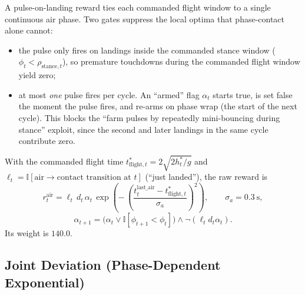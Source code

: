 \documentclass[11pt, a4paper]{article}
\begin{document}
A pulse-on-landing reward ties each commanded flight window to a single
continuous air phase. Two gates suppress the local optima that
phase-contact alone cannot:
\begin{itemize}
    \item the pulse only fires on landings inside the commanded stance window
    ($\phi_t < \rho_{\mathrm{stance},t}$), so premature touchdowns during the
    commanded flight window yield zero;
    \item at most \emph{one} pulse fires per cycle. An ``armed'' flag $\alpha_t$
    starts true, is set false the moment the pulse fires, and re-arms on phase
    wrap (the start of the next cycle). This blocks the ``farm pulses by
    repeatedly mini-bouncing during stance'' exploit, since the second and
    later landings in the same cycle contribute zero.
\end{itemize}
With the commanded flight time
$t^{*}_{\mathrm{flight},t} = 2\sqrt{2 h^{*}_t / g}$ and
$\ell_t = \mathbb{I}[\text{air}\!\to\!\text{contact transition at } t]$
(``just landed''), the raw reward is
\begin{equation}
    r^{\mathrm{air}}_t =
    \ell_t \, d_t \, \alpha_t \,
    \exp\!\left(
        -\,
        \left(
            \frac{
                t^{\mathrm{last\_air}}_t - t^{*}_{\mathrm{flight},t}
            }{
                \sigma_{a}
            }
        \right)^2
    \right),
    \qquad
    \sigma_{a} = 0.3\ \mathrm{s},
\end{equation}
\begin{equation}
    \alpha_{t+1} =
    \big(
        \alpha_t \vee \mathbb{I}[\phi_{t+1} < \phi_t]
    \big)
    \wedge \neg(\ell_t d_t \alpha_t).
\end{equation}
Its weight is $140.0$.

\subsection{Joint Deviation (Phase-Dependent Exponential)}
\end{document}
